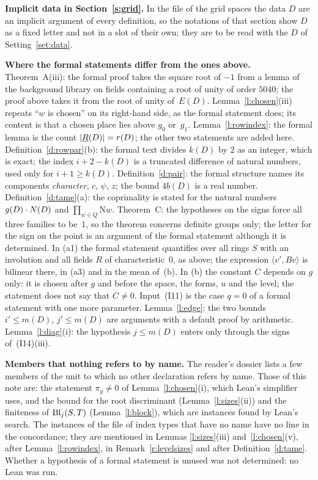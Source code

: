 \documentclass[11pt,a4paper]{article}
\newcommand{\m}[1]{\mbox{$#1$}}        %
\newcommand{\subhead}[1]{\par\addvspace{9pt plus 2pt}\Needspace{4\baselineskip}\noindent\textbf{#1}\enspace\ignorespaces}
\theoremstyle{plainx}
\theoremstyle{uprightx}
\newcommand{\Nm}{\mathrm{N}}                       %
\newcommand{\ED}[1]{E(#1)}
\newcommand{\bD}[1]{b(#1)}
\newcommand{\mD}[1]{m(#1)}
\newcommand{\rD}[1]{r(#1)}
\newcommand{\kD}[1]{k(#1)}
\newcommand{\gD}[1]{g(#1)}
\begin{document}
\subhead{Implicit data in Section~\ref{s:grid}.} In the file of the grid spaces the data $D$ are an implicit
argument of every definition, so the notations of that section show $D$ as a fixed letter and not in a slot of
their own; they are to be read with the $D$ of Setting~\ref{set:data}.

\subhead{Where the formal statements differ from the ones above.}
Theorem~A(iii): the formal proof takes the square root of $-1$ from a lemma of the background library on fields
containing a root of unity of order $5040$; the proof above takes it from the root of unity of~$\ED{D}$.
Lemma~\ref{l:chosen}(iii) repeats ``$w$ is chosen'' on its right-hand side, as the formal statement does; its content
is that a chosen place lies above $g_0$ or~$g_1$. Lemma~\ref{l:rowindex}: the formal lemma is the count
\m{|\Ridx{D}|=\rD{D}}; the other two statements are added here. Definition~\ref{d:rowpar}(b): the formal text divides
$\kD{D}$ by $2$ as an integer, which is exact; the index $i+2-\kD{D}$ is a truncated difference of natural numbers,
used only for $i+1\ge\kD{D}$. Definition~\ref{d:pair}: the formal structure names its components
\emph{character}, $c$, $\psi$, $z$; the bound $4\bD{D}$ is a real number. Definition~\ref{d:tame}(a): the coprimality is
stated for the natural numbers \m{\gD{D}\cdot\levelN{D}} and \m{\prod_{w\in Q}\Nm w}. Theorem~C: the hypotheses on
the signs force all three families to be~$1$, so the theorem concerns definite groups only; the letter for the sign
on the point is an argument of the formal statement although it is determined. In (a1) the formal statement
quantifies over all rings $S$ with an involution and all fields $R$ of characteristic~$0$, as above; the
expression \m{\langle v',Bv\rangle} is bilinear there, in (a3) and in the mean of~(b). In (b) the constant $C$
depends on $g$ only: it is chosen after $g$ and before the space, the forms, $u$ and the level; the statement does
not say that $C\ne0$. Input~(I11) is
the case $q=0$ of a formal statement with one more parameter. Lemma~\ref{l:edge}: the two bounds $i'\le \mD{D}$,
$j'\le \mD{D}$ are arguments with a default proof by arithmetic. Lemma~\ref{l:diag}(i): the hypothesis $j\le \mD{D}$ enters only
through the signs of~(I14)(iii).

\subhead{Members that nothing refers to by name.} The reader's dossier lists a few members of the unit to which
no other declaration refers by name. Those of this note are: the statement $\pi_g\ne0$ of
Lemma~\ref{l:chosen}(i), which Lean's simplifier uses, and the bound for the root discriminant
(Lemma~\ref{l:sizes}(ii)) and the finiteness of $\operatorname{Bl}_{j}(S,T)$ (Lemma~\ref{l:block}), which are instances found
by Lean's search. The instances of the file of index types that have no name have no line in the concordance;
they are mentioned in Lemmas \ref{l:sizes}(iii) and~\ref{l:chosen}(v), after Lemma~\ref{l:rowindex}, in
Remark~\ref{r:levelsizes} and after Definition~\ref{d:tame}. Whether a hypothesis of a formal statement is unused was not determined: no Lean
was run.
\end{document}
